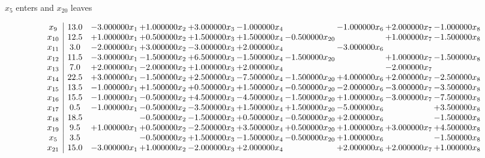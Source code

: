 \documentclass[10pt]{article}
\begin{document}
 $ x_{5} $ enters and $ x_{20} $ leaves 

 \[\begin{array}{c| c c@{\hskip 2pt} c@{\hskip 2pt} c@{\hskip 2pt} c@{\hskip 2pt} c@{\hskip 2pt} c@{\hskip 2pt} c@{\hskip 2pt} c@{\hskip 2pt} }
 x_{9}   &  13.0 & -3.000000 x_{1} & + 1.000000 x_{2} & + 3.000000 x_{3} & -1.000000 x_{4} &   & -1.000000 x_{6} & + 2.000000 x_{7} & -1.000000 x_{8}\\
 x_{10}   &  12.5 & + 1.000000 x_{1} & + 0.500000 x_{2} & + 1.500000 x_{3} & + 1.500000 x_{4} & -0.500000 x_{20} &   & + 1.000000 x_{7} & -1.500000 x_{8}\\
 x_{11}   &  3.0 & -2.000000 x_{1} & + 3.000000 x_{2} & -3.000000 x_{3} & + 2.000000 x_{4} &   & -3.000000 x_{6} &    &   \\
 x_{12}   &  11.5 & -3.000000 x_{1} & -1.500000 x_{2} & + 6.500000 x_{3} & -1.500000 x_{4} & -1.500000 x_{20} &   & + 1.000000 x_{7} & -1.500000 x_{8}\\
 x_{13}   &  7.0 & + 2.000000 x_{1} & -2.000000 x_{2} & + 1.000000 x_{3} & + 2.000000 x_{4} &    &   & -2.000000 x_{7} &   \\
 x_{14}   &  22.5 & + 3.000000 x_{1} & -1.500000 x_{2} & + 2.500000 x_{3} & -7.500000 x_{4} & -1.500000 x_{20} & + 4.000000 x_{6} & + 2.000000 x_{7} & -2.500000 x_{8}\\
 x_{15}   &  13.5 & -1.000000 x_{1} & + 1.500000 x_{2} & + 0.500000 x_{3} & + 1.500000 x_{4} & -0.500000 x_{20} & -2.000000 x_{6} & -3.000000 x_{7} & -3.500000 x_{8}\\
 x_{16}   &  15.5 & -1.000000 x_{1} & -0.500000 x_{2} & + 4.500000 x_{3} & -4.500000 x_{4} & -1.500000 x_{20} & + 1.000000 x_{6} & -3.000000 x_{7} & -7.500000 x_{8}\\
 x_{17}   &  0.5 & -1.000000 x_{1} & -0.500000 x_{2} & -3.500000 x_{3} & + 1.500000 x_{4} & + 1.500000 x_{20} & -5.000000 x_{6} &   & + 3.500000 x_{8}\\
 x_{18}   &  18.5  &   & -0.500000 x_{2} & -1.500000 x_{3} & + 0.500000 x_{4} & -0.500000 x_{20} & + 2.000000 x_{6} &   & -1.500000 x_{8}\\
 x_{19}   &  9.5 & + 1.000000 x_{1} & + 0.500000 x_{2} & -2.500000 x_{3} & + 3.500000 x_{4} & + 0.500000 x_{20} & + 1.000000 x_{6} & + 3.000000 x_{7} & + 4.500000 x_{8}\\
 x_{5}   &  3.5  &   & -0.500000 x_{2} & + 1.500000 x_{3} & -1.500000 x_{4} & -0.500000 x_{20} & + 1.000000 x_{6} &   & -1.500000 x_{8}\\
 x_{21}   &  15.0 & -3.000000 x_{1} & + 1.000000 x_{2} & -2.000000 x_{3} & + 2.000000 x_{4} &   & + 2.000000 x_{6} & + 2.000000 x_{7} & + 1.000000 x_{8}\\

\end{array}\]
\end{document}
